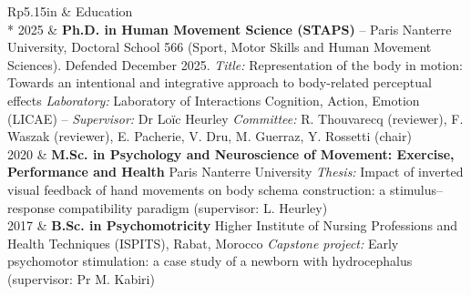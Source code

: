 \documentclass[a4paper, 11pt]{article}
\newcommand{\headingfont}{\Large\color{PineGreen}}
\newenvironment{SectionTable}[1]{
	\renewcommand*{\arraystretch}{1.1}
	\setlength{\tabcolsep}{8pt}
	\begin{longtable}{Rp{5.15in}} & #1 \\*}
{\end{longtable}\vspace{2pt}}
\begin{document}
\begin{SectionTable}{\headingfont Education}
	2025 &
	\textbf{Ph.D. in Human Movement Science (STAPS)} -- Paris Nanterre University, Doctoral School 566 (Sport, Motor Skills and Human Movement Sciences). Defended December 2025.\newline
	\textit{Title:} Representation of the body in motion: Towards an intentional and integrative approach to body-related perceptual effects\newline
	\textit{Laboratory:} Laboratory of Interactions Cognition, Action, Emotion (LICAE) -- \textit{Supervisor:} Dr Loïc Heurley\newline
	\textit{Committee:} R. Thouvarecq (reviewer), F. Waszak (reviewer), E. Pacherie, V. Dru, M. Guerraz, Y. Rossetti (chair) \\

	2020 &
	\textbf{M.Sc. in Psychology and Neuroscience of Movement: Exercise, Performance and Health}\newline
	Paris Nanterre University\newline
	\textit{Thesis:} Impact of inverted visual feedback of hand movements on body schema construction: a stimulus--response compatibility paradigm (supervisor: L. Heurley) \\

	2017 &
	\textbf{B.Sc. in Psychomotricity}\newline
	Higher Institute of Nursing Professions and Health Techniques (ISPITS), Rabat, Morocco\newline
	\textit{Capstone project:} Early psychomotor stimulation: a case study of a newborn with hydrocephalus (supervisor: Pr M. Kabiri) \\
\end{SectionTable}
\end{document}
